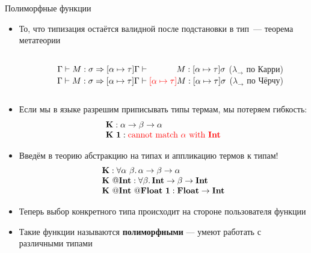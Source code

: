     \begin{frame}{Полиморфные функции}
        \vspace{-0.5em}
        \begin{itemize}
            \item[\advanced] То, что типизация остаётся валидной после подстановки в тип~--- теорема метатеории
            \vspace{-1.3em}
            \begin{columns}[onlytextwidth]
                \begin{column}[t]{0.05\textwidth}
                \end{column}\hfill%
                \begin{column}[t]{0.95\textwidth}
                    \begin{theorem}
                        $\Gamma\vdash M : \sigma \Rightarrow [\alpha\mapsto\tau]\Gamma\vdash \hspace{3.25em}M : [\alpha\mapsto\tau]\sigma$ {\color{blue} ($\lambda_{\rightarrow}$ по Карри)}
                        \\
                        $\Gamma\vdash M : \sigma \Rightarrow [\alpha\mapsto\tau]\Gamma\vdash {\color{red} [\alpha\mapsto\tau]}M : [\alpha\mapsto\tau]\sigma$ {\color{red} ($\lambda_{\rightarrow}$ по Чёрчу)}
                    \end{theorem}
                \end{column}
            \end{columns}
            \vspace{0.3em}
            \item Если мы в языке разрешим приписывать типы термам, мы потеряем гибкость:
            \[
                \begin{array}{l}
                    \mathbf{K} : \alpha \to \beta \to \alpha \\
                    \mathbf{K} ~ \mathbf{1} : {\color{red}\text{cannot match } \alpha \text{ with } \mathbf{Int}}
                \end{array}
            \]
            \item Введём в теорию абстракцию на типах и аппликацию термов к типам!
            \[
                \begin{array}{l}
                    \mathbf{K} : \forall \alpha ~ \beta \ldotp \alpha \to \beta \to \alpha
                    \\
                    \mathbf{K} ~ @\mathbf{Int} : \forall \beta \ldotp \mathbf{Int} \to \beta \to \mathbf{Int}
                    \\
                    \mathbf{K} ~ @\mathbf{Int} ~ @\mathbf{Float} ~ \mathbf{1} : \mathbf{Float} \to \mathbf{Int}
                \end{array}
            \]
            \item Теперь выбор конкретного типа происходит на стороне пользователя функции
            \item Такие функции называются \textbf{полиморфными} --- умеют работать с различными типами
        \end{itemize}
    \end{frame}

